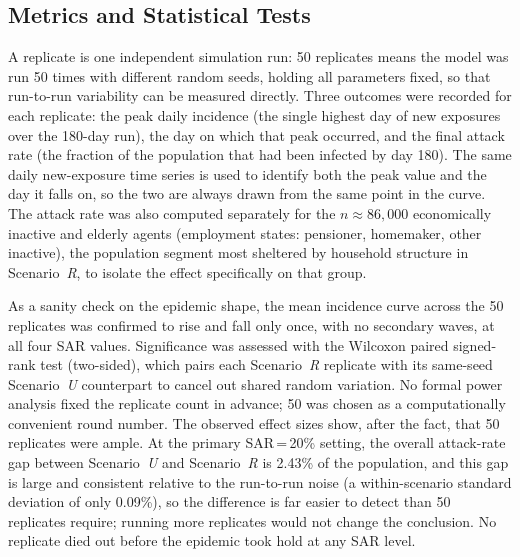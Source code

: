 \documentclass{article}
\begin{document}
\subsection{Metrics and Statistical Tests}\label{metrics-statistical-tests}

A replicate is one independent simulation run: 50 replicates means the model was run 50 times with different random seeds, holding all parameters fixed, so that run-to-run variability can be measured directly. Three outcomes were recorded for each replicate: the peak daily incidence (the single highest day of new exposures over the 180-day run), the day on which that peak occurred, and the final attack rate (the fraction of the population that had been infected by day 180). The same daily new-exposure time series is used to identify both the peak value and the day it falls on, so the two are always drawn from the same point in the curve. The attack rate was also computed separately for the $n \approx 86{,}000$ economically inactive and elderly agents (employment states: pensioner, homemaker, other inactive), the population segment most sheltered by household structure in Scenario~\textit{R}, to isolate the effect specifically on that group.

As a sanity check on the epidemic shape, the mean incidence curve across the 50 replicates was confirmed to rise and fall only once, with no secondary waves, at all four SAR values. Significance was assessed with the Wilcoxon paired signed-rank test (two-sided), which pairs each Scenario~\textit{R} replicate with its same-seed Scenario~\textit{U} counterpart to cancel out shared random variation. No formal power analysis fixed the replicate count in advance; 50 was chosen as a computationally convenient round number. The observed effect sizes show, after the fact, that 50 replicates were ample. At the primary SAR\,=\,20\% setting, the overall attack-rate gap between Scenario~\textit{U} and Scenario~\textit{R} is 2.43\% of the population, and this gap is large and consistent relative to the run-to-run noise (a within-scenario standard deviation of only 0.09\%), so the difference is far easier to detect than 50 replicates require; running more replicates would not change the conclusion. No replicate died out before the epidemic took hold at any SAR level.
\end{document}
